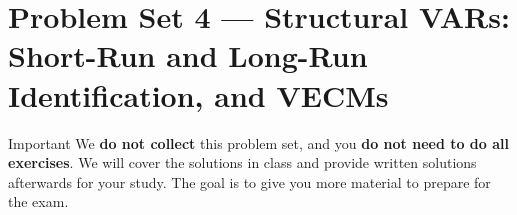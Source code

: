\documentclass[12pt]{article}
\theoremstyle{definition} %
\theoremstyle{plain}
\begin{document}

\section*{Problem Set 4 --- Structural VARs: Short-Run and Long-Run Identification, and VECMs}

\begin{alertblock}{Important}
We \textbf{do not collect} this problem set, and you \textbf{do not need to do all exercises}.
We will cover the solutions in class and provide written solutions afterwards for your study.
The goal is to give you more material to prepare for the exam.
\end{alertblock}

\vspace{0.8em}
\end{document}
